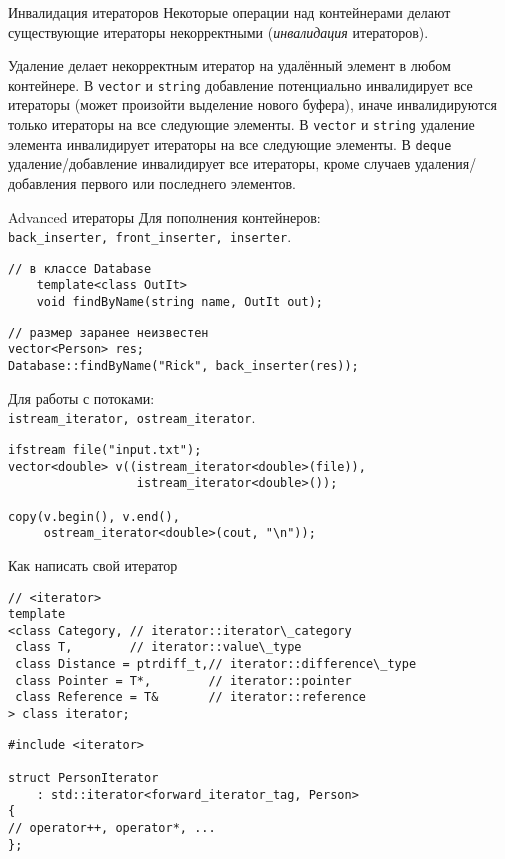 \documentclass{beamer}
\begin{document}
\begin{frame}[fragile]{Инвалидация итераторов}
    Некоторые операции над контейнерами делают существующие итераторы
    некорректными (\emph{инвалидация} итераторов).
    \bigskip
    
    \begin{enumerate}
        \pitem Удаление делает некорректным итератор на удалённый элемент в любом контейнере.
        \pitem В \texttt{vector} и \texttt{string}
            добавление потенциально инвалидирует все итераторы (может произойти выделение нового буфера), иначе инвалидируются только итераторы на все следующие элементы.
        \pitem В \texttt{vector} и \texttt{string} удаление элемента инвалидирует итераторы на все следующие элементы.
        \pitem В \texttt{deque} удаление/добавление инвалидирует все итераторы, кроме 
            случаев удаления/добавления первого или последнего элементов.
        
    \end{enumerate}
\end{frame}
\begin{frame}[fragile]{Advanced итераторы}
Для пополнения контейнеров:\\
{\tt back\_inserter, front\_inserter, inserter}.
\begin{lstlisting}
// в классе Database
    template<class OutIt>
    void findByName(string name, OutIt out);
\end{lstlisting}
\begin{lstlisting}
// размер заранее неизвестен
vector<Person> res; 
Database::findByName("Rick", back_inserter(res));
\end{lstlisting}
Для работы с потоками: \\{\tt istream\_iterator, ostream\_iterator}.
\begin{lstlisting}
ifstream file("input.txt");
vector<double> v((istream_iterator<double>(file)), 
                  istream_iterator<double>());
    
copy(v.begin(), v.end(), 
     ostream_iterator<double>(cout, "\n"));
\end{lstlisting}
\end{frame}

\begin{frame}[fragile]{Как написать свой итератор}
\begin{lstlisting}
// <iterator>
template 
<class Category, // iterator::iterator\_category
 class T,        // iterator::value\_type
 class Distance = ptrdiff_t,// iterator::difference\_type
 class Pointer = T*,        // iterator::pointer
 class Reference = T&       // iterator::reference
> class iterator;
\end{lstlisting}

\begin{lstlisting}
#include <iterator>

struct PersonIterator 
    : std::iterator<forward_iterator_tag, Person>
{
// operator++, operator*, ... 
};
\end{lstlisting}
\end{frame}
\end{document}
